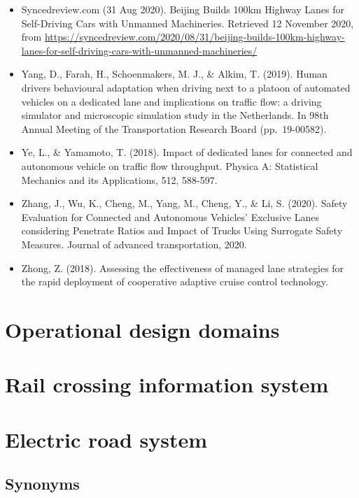 \documentclass[
]{book}
\begin{document}
\begin{itemize}
\item
  Syncedreview.com (31 Aug 2020). Beijing Builds 100km Highway Lanes for Self-Driving Cars with Unmanned Machineries. Retrieved 12 November 2020, from \url{https://syncedreview.com/2020/08/31/beijing-builds-100km-highway-lanes-for-self-driving-cars-with-unmanned-machineries/}
\item
  Yang, D., Farah, H., Schoenmakers, M. J., \& Alkim, T. (2019). Human drivers behavioural adaptation when driving next to a platoon of automated vehicles on a dedicated lane and implications on traffic flow: a driving simulator and microscopic simulation study in the Netherlands. In 98th Annual Meeting of the Transportation Research Board (pp.~19-00582).
\item
  Ye, L., \& Yamamoto, T. (2018). Impact of dedicated lanes for connected and autonomous vehicle on traffic flow throughput. Physica A: Statistical Mechanics and its Applications, 512, 588-597.
\item
  Zhang, J., Wu, K., Cheng, M., Yang, M., Cheng, Y., \& Li, S. (2020). Safety Evaluation for Connected and Autonomous Vehicles' Exclusive Lanes considering Penetrate Ratios and Impact of Trucks Using Surrogate Safety Measures. Journal of advanced transportation, 2020.
\item
  Zhong, Z. (2018). Assessing the effectiveness of managed lane strategies for the rapid deployment of cooperative adaptive cruise control technology.
\end{itemize}

\hypertarget{operational-design-domains}{%
\section{Operational design domains}\label{operational-design-domains}}

\hypertarget{rail-crossing-information-system}{%
\section{Rail crossing information system}\label{rail-crossing-information-system}}

\hypertarget{ers}{%
\section{Electric road system}\label{ers}}

\hypertarget{synonyms-1}{%
\subsection*{Synonyms}\label{synonyms-1}}
\end{document}
